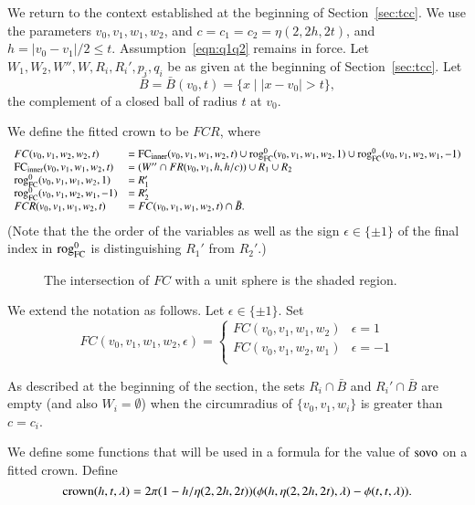 We return to the context established at the beginning
of Section~\ref{sec:tcc}.  We use the parameters $v_0,v_1,w_1,w_2$,
and $c=c_1=c_2=\eta(2,2h,2t)$, and $h =|v_0-v_1|/2 \le t$. 
Assumption~\ref{eqn:q1q2} remains in force.
Let $W_1,W_2,W'',W,R_i,R_i',p_i,q_i$ be as given at the
beginning of Section~\ref{sec:tcc}.
%
Let 
  $$\bar B = \bar B(v_0,t) = \{x \mid |x-v_0| > t\},$$
the complement of a closed ball of radius $t$ at $v_0$.
%
\begin{definition}\label{def:fitted-crown}
We define the fitted crown to be $FCR$, where
$$
\begin{array}{lll}
FC(v_0,v_1,w_2,w_2,t) &= \FCinner(v_0,v_1,w_1,w_2,t) \cup 
      \rogFC (v_0,v_1,w_1,w_2,1)\cup \rogFC(v_0,v_1,w_2,w_1,-1)\\
%
\FCinner(v_0,v_1,w_1,w_2,t) &= (W'' \cap FR(v_0,v_1,h,h/c))\cup R_1 \cup R_2 \\
%
\rogFC (v_0,v_1,w_1,w_2,1) &= R_1'\\
\rogFC (v_0,v_1,w_2,w_1,-1) &= R_2'\\
%
FCR(v_0,v_1,w_1,w_2,t) &= FC(v_0,v_1,w_1,w_2,t) \cap \bar B.
\end{array}
$$
(Note that the the order of the variables as well as the sign $\epsilon\in\{\pm1\}$ of the final index in ${\operatorname{rog}}^0_{\text{FC}}$ is distinguishing $R_1'$ from $R_2'$.)
\end{definition}


\begin{figure}[htb]
  \centering
  \caption{The intersection of
    $FC$ with a unit sphere is the shaded region.}
  \label{fig:anchor-quarter}
\end{figure}

We extend the notation as follows.  Let $\epsilon\in\{\pm 1\}$.
Set
  $$
    FC(v_0,v_1,w_1,w_2,\epsilon) = \begin{cases}
      FC(v_0,v_1,w_1,w_2) & \epsilon = 1\\
      FC(v_0,v_1,w_2,w_1) & \epsilon = -1\\
    \end{cases}
  $$

As described at the beginning of the section, the 
sets $R_i\cap \bar B$ and $R_i'\cap \bar B$ are empty
(and also $W_i=\emptyset$) when the circumradius of 
$\{v_0,v_1,w_i\}$ is greater than $c=c_i$.

We define some functions that will be used in a formula
for the value of ${\operatorname{sovo}}$ on a fitted crown.
Define
\begin{equation}\operatorname{crown}(h,t,\lambda) =
2\pi(1-h/\eta(2,2h,2t))(\phi(h,\eta(2,2h,2t),\lambda)-\phi(t,t,\lambda)). 
\end{equation} 

